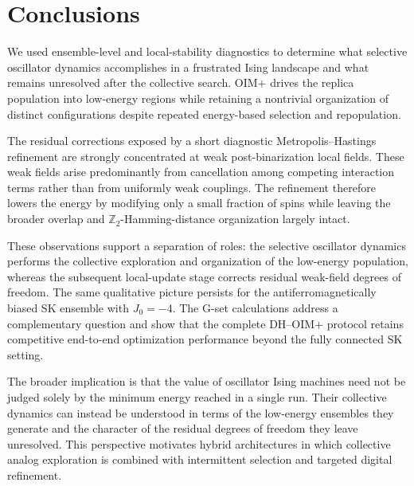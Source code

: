 \documentclass[
reprint,
amsmath,amssymb,
aps,
pre,
floatfix,
]{revtex4-2}
\begin{document}
\section{Conclusions}
\label{sec:conc}

We used ensemble-level and local-stability diagnostics to determine what
selective oscillator dynamics accomplishes in a frustrated Ising landscape
and what remains unresolved after the collective search. OIM+ drives the
replica population into low-energy regions while retaining a nontrivial
organization of distinct configurations despite repeated energy-based
selection and repopulation.

The residual corrections exposed by a short diagnostic
Metropolis--Hastings refinement are strongly concentrated at weak
post-binarization local fields. These weak fields arise predominantly from
cancellation among competing interaction terms rather than from uniformly
weak couplings. The refinement therefore lowers the energy by modifying
only a small fraction of spins while leaving the broader overlap and
$\mathbb{Z}_2$-Hamming-distance organization largely intact.

These observations support a separation of roles: the selective oscillator
dynamics performs the collective exploration and organization of the
low-energy population, whereas the subsequent local-update stage corrects
residual weak-field degrees of freedom. The same qualitative picture
persists for the antiferromagnetically biased SK ensemble with $J_0=-4$.
The G-set calculations address a complementary question and show that the
complete DH--OIM+ protocol retains competitive end-to-end optimization
performance beyond the fully connected SK setting.

The broader implication is that the value of oscillator Ising machines
need not be judged solely by the minimum energy reached in a single run.
Their collective dynamics can instead be understood in terms of the
low-energy ensembles they generate and the character of the residual
degrees of freedom they leave unresolved. This perspective motivates
hybrid architectures in which collective analog exploration is combined
with intermittent selection and targeted digital refinement.
\end{document}
